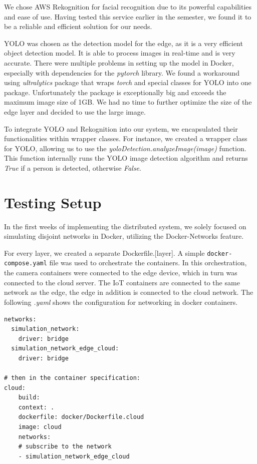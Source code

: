 \documentclass[conference]{IEEEtran}
\begin{document}
We chose AWS Rekognition for facial recognition due to its powerful capabilities and ease of use. Having tested this service earlier in the semester, we found it to be a reliable and efficient solution for our needs.

YOLO was chosen as the detection model for the edge, as it is a very efficient object detection model. It is able to process images in real-time and is very accurate. There were multiple problems in setting up the model in Docker, especially with dependencies for the \textit{pytorch} library. We found a workaround using \textit{ultralytics} package that wraps \textit{torch} and special classes for YOLO into one package. Unfortunately the package is exceptionally big and exceeds the maximum image size of 1GB. We had no time to further optimize the size of the edge layer and decided to use the large image. 

To integrate YOLO and Rekognition into our system, we encapsulated their functionalities within wrapper classes. For instance, we created a wrapper class for YOLO, allowing us to use the \textit{yoloDetection.analyzeImage(image)} function. This function internally runs the YOLO image detection algorithm and returns \textit{True} if a person is detected, otherwise \textit{False}.


\section{Testing Setup}
In the first weeks of implementing the distributed system, we solely focused on simulating disjoint networks in Docker, utilizing the Docker-Networks feature. 

For every layer, we created a separate Dockerfile.[layer]. A simple \texttt{docker-compose.yaml} file was used to orchestrate the containers. In this orchestration, the camera containers were connected to the edge device, which in turn was connected to the cloud server. 
The IoT containers are connected to the same network as the edge, the edge in addition is connected to the cloud network. 
The following \textit{.yaml} shows the configuration for networking in docker containers.

\begin{verbatim}
networks:
  simulation_network:
    driver: bridge
  simulation_network_edge_cloud:
    driver: bridge

# then in the container specification: 
cloud: 
    build:
    context: .
    dockerfile: docker/Dockerfile.cloud
    image: cloud
    networks:
    # subscribe to the network
    - simulation_network_edge_cloud 
\end{verbatim}
\end{document}
